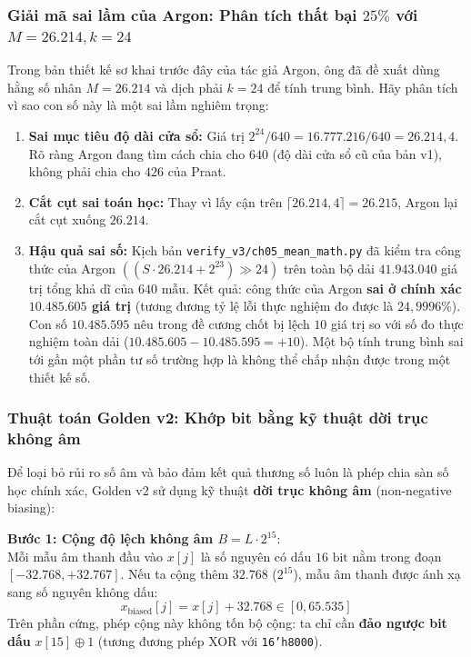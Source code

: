 \subsubsection*{Giải mã sai lầm của Argon: Phân tích thất bại $25\%$ với $M = 26.214, k = 24$}
Trong bản thiết kế sơ khai trước đây của tác giả Argon, ông đã đề xuất dùng hằng số nhân $M = 26.214$ và dịch phải $k = 24$ để tính trung bình. Hãy phân tích vì sao con số này là một sai lầm nghiêm trọng:
\begin{enumerate}[leftmargin=1.5em, itemsep=2pt]
    \item \textbf{Sai mục tiêu độ dài cửa sổ:} Giá trị $2^{24} / 640 = 16.777.216 / 640 = 26.214{,}4$. Rõ ràng Argon đang tìm cách chia cho $640$ (độ dài cửa sổ cũ của bản v1), không phải chia cho $426$ của Praat.
    \item \textbf{Cắt cụt sai toán học:} Thay vì lấy cận trên $\lceil 26.214{,}4 \rceil = 26.215$, Argon lại cắt cụt xuống $26.214$.
    \item \textbf{Hậu quả sai số:} Kịch bản \texttt{verify\_v3/ch05\_mean\_math.py} đã kiểm tra công thức của Argon $((S \cdot 26.214 + 2^{23}) \gg 24)$ trên toàn bộ dải $41.943.040$ giá trị tổng khả dĩ của $640\text{ mẫu}$. Kết quả: công thức của Argon \textbf{sai ở chính xác $10.485.605$ giá trị} (tương đương tỷ lệ lỗi thực nghiệm đo được là \textbf{$24{,}9996\%$}). Con số $10.485.595$ nêu trong đề cương chốt bị lệch $10$ giá trị so với số đo thực nghiệm toàn dải ($10.485.605 - 10.485.595 = +10$). Một bộ tính trung bình sai tới gần một phần tư số trường hợp là không thể chấp nhận được trong một thiết kế số.
\end{enumerate}

\subsubsection*{Thuật toán Golden v2: Khớp bit bằng kỹ thuật dời trục không âm}
Để loại bỏ rủi ro số âm và bảo đảm kết quả thương số luôn là phép chia sàn số học chính xác, Golden v2 sử dụng kỹ thuật \textbf{dời trục không âm} (non-negative biasing):

\textbf{Bước 1: Cộng độ lệch không âm $B = L \cdot 2^{15}$}:\\
Mỗi mẫu âm thanh đầu vào $x[j]$ là số nguyên có dấu $16\text{ bit}$ nằm trong đoạn $[-32.768, +32.767]$. Nếu ta cộng thêm $32.768$ ($2^{15}$), mẫu âm thanh được ánh xạ sang số nguyên không dấu:
\begin{equation}
x_{\text{biased}}[j] = x[j] + 32.768 \in [0, 65.535]
\end{equation}
Trên phần cứng, phép cộng này không tốn bộ cộng: ta chỉ cần \textbf{đảo ngược bit dấu} $x[15] \oplus 1$ (tương đương phép XOR với \texttt{16'h8000}).

